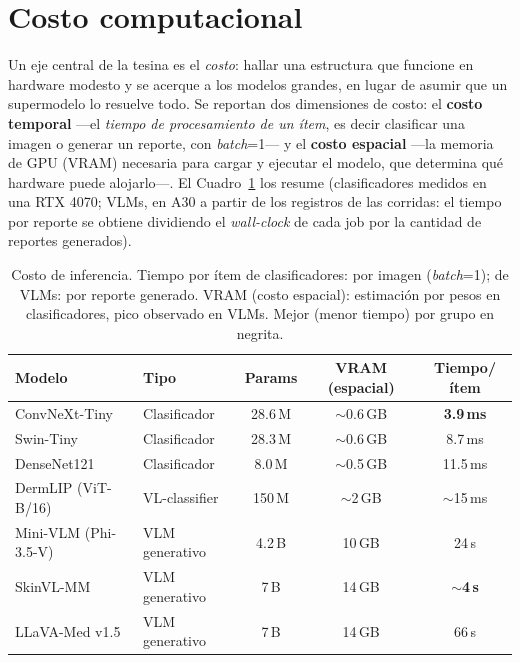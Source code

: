 \documentclass[11pt, a4paper]{article}
\begin{document}
\section{Costo computacional}
\label{sec:costo}
Un eje central de la tesina es el \emph{costo}: hallar una estructura que funcione en hardware modesto y
se acerque a los modelos grandes, en lugar de asumir que un supermodelo lo resuelve todo. Se reportan dos
dimensiones de costo: el \textbf{costo temporal} —el \emph{tiempo de procesamiento de un ítem}, es decir
clasificar una imagen o generar un reporte, con \emph{batch}=1— y el \textbf{costo espacial} —la memoria
de GPU (VRAM) necesaria para cargar y ejecutar el modelo, que determina qué hardware puede alojarlo—. El
Cuadro~\ref{tab:costo} los resume (clasificadores medidos en una RTX 4070; VLMs, en A30 a partir de los
registros de las corridas: el tiempo por reporte se obtiene dividiendo el \emph{wall-clock} de cada job
por la cantidad de reportes generados).

\begin{table}[H]
  \centering
  \caption{Costo de inferencia. Tiempo por ítem de clasificadores: por imagen (\emph{batch}=1); de VLMs:
  por reporte generado. VRAM (costo espacial): estimación por pesos en clasificadores, pico observado en
  VLMs. Mejor (menor tiempo) por grupo en negrita.}
  \label{tab:costo}
  \small
  \begin{tabular}{llccc}
    \toprule
    \textbf{Modelo} & \textbf{Tipo} & \textbf{Params} & \textbf{VRAM (espacial)} & \textbf{Tiempo/ítem} \\
    \midrule
    ConvNeXt-Tiny        & Clasificador     & 28.6\,M & $\sim$0.6\,GB & \textbf{3.9\,ms} \\
    Swin-Tiny            & Clasificador     & 28.3\,M & $\sim$0.6\,GB & 8.7\,ms \\
    DenseNet121          & Clasificador     & 8.0\,M  & $\sim$0.5\,GB & 11.5\,ms \\
    DermLIP (ViT-B/16)   & VL-classifier    & 150\,M  & $\sim$2\,GB   & $\sim$15\,ms \\
    \midrule
    Mini-VLM (Phi-3.5-V) & VLM generativo   & 4.2\,B  & 10\,GB        & 24\,s \\
    SkinVL-MM            & VLM generativo   & 7\,B    & 14\,GB        & \textbf{$\sim$4\,s} \\
    LLaVA-Med v1.5       & VLM generativo   & 7\,B    & 14\,GB        & 66\,s \\
    \bottomrule
  \end{tabular}
\end{table}
\end{document}
